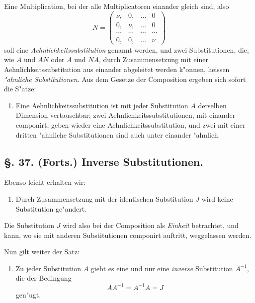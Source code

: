 \documentclass[12pt,a4paper]{article}
\theoremstyle{weber}
\begin{document}
Eine Multiplication, bei der alle Multiplicatoren einander gleich sind, also
\[
N = \begin{pmatrix}
\nu, & 0, & \ldots & 0 \\
0, & \nu, & \ldots & 0 \\
\cdots & \cdots & \cdots & \cdots \\
0, & 0, & \ldots & \nu
\end{pmatrix}
\]
soll eine \textit{Aehnlichkeitssubstitution} genannt werden, und zwei Substitutionen, die, wie $A$ und $AN$ oder $A$ und $NA$, durch Zusammensetzung mit einer Aehnlichkeitssubstitution aus einander abgeleitet werden k"onnen, heissen \textit{"ahnliche Substitutionen}. Aus dem Gesetze der Composition ergeben sich sofort die S"atze:

\begin{enumerate}[label=\arabic*., resume]
\item Eine Aehnlichkeitssubstitution ist mit jeder Substitution $A$ derselben Dimension vertauschbar; zwei Aehnlichkeitssubstitutionen, mit einander componirt, geben wieder eine Aehnlichkeitssubstitution, und zwei mit einer dritten "ahnliche Substitutionen sind auch unter einander "ahnlich.
\end{enumerate}


\newpage
\subsection*{\S. 37. (Forts.) Inverse Substitutionen.}

Ebenso leicht erhalten wir:

\begin{enumerate}[label=\arabic*., resume]
\item Durch Zusammensetzung mit der identischen Substitution $J$ wird keine Substitution ge"andert.
\end{enumerate}

Die Substitution $J$ wird also bei der Composition als \textit{Einheit} betrachtet, und kann, wo sie mit anderen Substitutionen componirt auftritt, weggelassen werden.

Nun gilt weiter der Satz:

\begin{enumerate}[label=\arabic*., resume]
\item Zu jeder Substitution $A$ giebt es eine und nur eine \textit{inverse} Substitution $A^{-1}$, die der Bedingung
\begin{equation}\label{eq:15}
AA^{-1} = A^{-1}A = J
\end{equation}
gen"ugt.
\end{enumerate}
\end{document}
